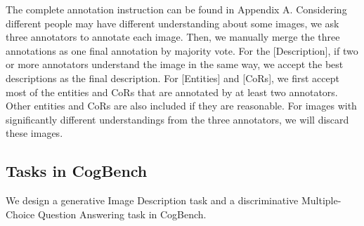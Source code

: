 The complete annotation instruction can be found in Appendix A. %
Considering different people may have different understanding about some images, we ask three annotators to annotate each image. 
Then, we manually merge the three annotations as one final annotation by majority vote. 
For the [Description], if two or more annotators understand the image in the same way, we accept the best descriptions as the final description.
For [Entities] and [CoRs], we first accept most of the entities and CoRs that are annotated by at least two annotators. 
Other entities and CoRs are also included if they are reasonable.
For images with significantly different understandings from the three annotators, we will discard these images.







\subsection{Tasks in CogBench}

We design a generative Image Description task and a discriminative Multiple-Choice Question Answering task in CogBench.

